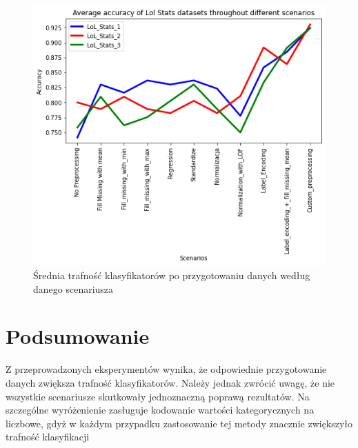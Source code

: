 \documentclass{article}
\begin{document}
\begin{figure}[H]
\centerline{\includegraphics{Lol_Stats_Avg}}
\centering
\caption{Średnia trafność klasyfikatorów po przygotowaniu danych według danego scenariusza}
\end{figure}

\section{Podsumowanie}
Z przeprowadzonych eksperymentów wynika, 
że odpowiednie przygotowanie danych zwiększa trafność 
klasyfikatorów. Należy jednak zwrócić uwagę, że nie wszystkie 
scenariusze skutkowały jednoznaczną poprawą rezultatów. 
Na szczególne wyróżenienie zasługuje kodowanie wartości kategorycznych 
na liczbowe, gdyż w każdym przypadku zastosowanie tej metody znacznie zwiększyło
trafność klasyfikacji
\end{document}
